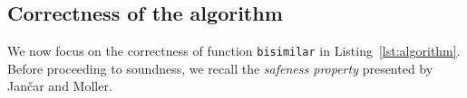 %
%
%

\subsection{Correctness of the algorithm}

We now focus on the correctness of function \lstinline|bisimilar| in
Listing~\ref{lst:algorithm}.  Before proceeding to soundness, we
recall the \emph{safeness property} presented by Jan{\v{c}}ar and
Moller.

